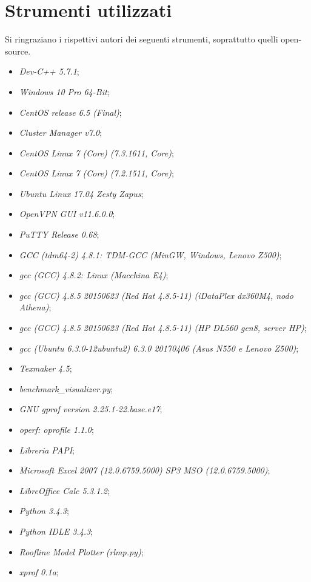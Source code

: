 \section{Strumenti utilizzati}

Si ringraziano i rispettivi autori dei seguenti strumenti, soprattutto quelli open-source. 

\begin{itemize}
\item\emph{Dev-C++ 5.7.1};
\item\emph{Windows 10 Pro 64-Bit};
\item\emph{CentOS release 6.5 (Final)};
\item\emph{Cluster Manager v7.0};
\item\emph{CentOS Linux 7 (Core) (7.3.1611, Core)};
\item\emph{CentOS Linux 7 (Core) (7.2.1511, Core)};
\item\emph{Ubuntu Linux 17.04 Zesty Zapus};
\item\emph{OpenVPN GUI v11.6.0.0};
\item\emph{PuTTY Release 0.68};
\item\emph{GCC (tdm64-2) 4.8.1: TDM-GCC (MinGW, Windows, Lenovo Z500)};
\item\emph{gcc (GCC) 4.8.2: Linux (Macchina E4)};
\item\emph{gcc (GCC) 4.8.5 20150623 (Red Hat 4.8.5-11) (iDataPlex dx360M4, nodo Athena)};
\item\emph{gcc (GCC) 4.8.5 20150623 (Red Hat 4.8.5-11) (HP DL560 gen8, server HP)};
\item\emph{gcc (Ubuntu 6.3.0-12ubuntu2) 6.3.0 20170406 (Asus N550 e Lenovo Z500)};
\item\emph{Texmaker 4.5};
\item\emph{benchmark\_visualizer.py};
\item\emph{GNU gprof version 2.25.1-22.base.e17};
\item\emph{operf: oprofile 1.1.0};
\item\emph{Libreria PAPI};
\item\emph{Microsoft Excel 2007 (12.0.6759.5000) SP3 MSO (12.0.6759.5000)};
\item\emph{LibreOffice Calc 5.3.1.2};
\item\emph{Python 3.4.3};
\item\emph{Python IDLE 3.4.3};
\item\emph{Roofline Model Plotter (rlmp.py)};
\item\emph{xprof 0.1a};
\end{itemize}
